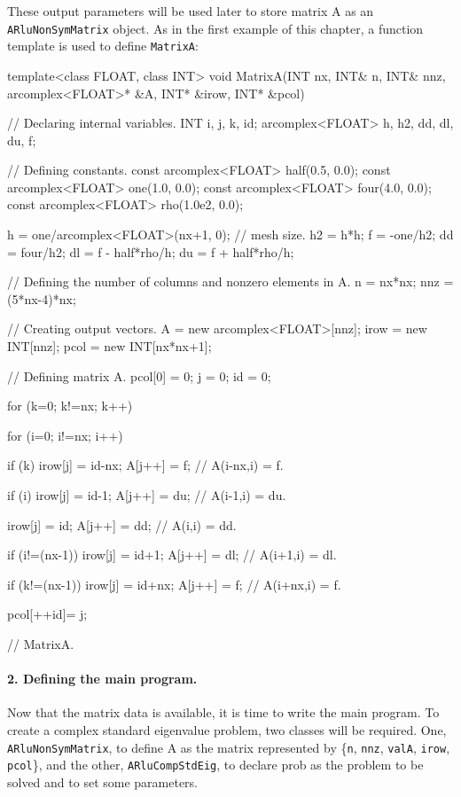 These output parameters will be used later to store matrix A as an \texttt{ARluNonSymMatrix} object. 
As in the first example of this chapter, a function template is used to define \texttt{MatrixA}:

\begin{cppcode}
template<class FLOAT, class INT>
void MatrixA(INT nx, INT& n, INT& nnz, arcomplex<FLOAT>* &A, 
INT* &irow, INT* &pcol)
{
	// Declaring internal variables.
	INT              i, j, k, id;
	arcomplex<FLOAT> h, h2, dd, dl, du, f;
	
	// Defining constants.
	const arcomplex<FLOAT> half(0.5, 0.0);
	const arcomplex<FLOAT> one(1.0, 0.0);
	const arcomplex<FLOAT> four(4.0, 0.0);
	const arcomplex<FLOAT> rho(1.0e2, 0.0);
	
	h   = one/arcomplex<FLOAT>(nx+1, 0);  // mesh size.
	h2  = h*h;
	f   = -one/h2;
	dd  = four/h2;                       
	dl  = f - half*rho/h;                
	du  = f + half*rho/h;
	
	// Defining the number of columns and nonzero elements in A.
	n   = nx*nx;
	nnz = (5*nx-4)*nx;
	
	// Creating output vectors.
	A    = new arcomplex<FLOAT>[nnz];
	irow = new INT[nnz];
	pcol = new INT[nx*nx+1];
	
	// Defining matrix A.
	pcol[0] = 0;
	j       = 0;
	id      = 0;
	
	for (k=0; k!=nx; k++) {
		for (i=0; i!=nx; i++) {
			
			if (k) {
				irow[j] = id-nx; 
				A[j++]  = f;       // A(i-nx,i) = f.
			}
			
			if (i) {
				irow[j] = id-1;
				A[j++]  = du;      // A(i-1,i) = du.
			}
			
			irow[j]   = id;
			A[j++]    = dd;        // A(i,i) = dd.
			
			if (i!=(nx-1)) {
				irow[j] = id+1;
				A[j++]  = dl;      // A(i+1,i) = dl.
			}
			
			if (k!=(nx-1)) {
				irow[j] = id+nx;
				A[j++]  = f;       // A(i+nx,i) = f.
			}
			
			pcol[++id]= j;
		}
	}
} // MatrixA.
\end{cppcode}

\paragraph{2. Defining the main program.}

Now that the matrix data is available, it is time to write the main program. To create a complex standard eigenvalue problem, two \ARPP{} classes will be required. One, \texttt{ARluNonSymMatrix}, to define A as the matrix represented by \{\texttt{n}, \texttt{nnz}, \texttt{valA}, \texttt{irow}, \texttt{pcol}\}, and the other, \texttt{ARluCompStdEig}, to declare prob as the problem to be solved and to set some parameters.

